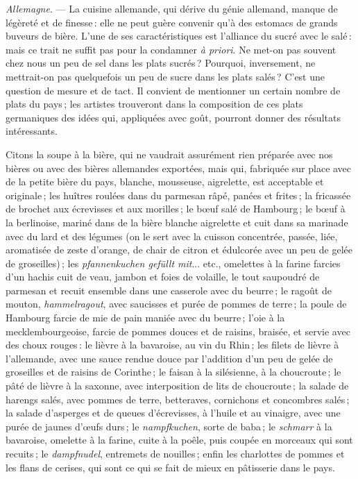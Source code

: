 \sk

\textit{Allemagne}. — La cuisine allemande, qui dérive du génie allemand,
manque de légèreté et de finesse : elle ne peut guère convenir qu'à des
estomacs de grands buveurs de bière. L'une de ses caractéristiques est
l'alliance du sucré avec le salé : mais ce trait ne suffit pas pour la
condamner \textit{à priori}. Ne met-on pas souvent chez nous un peu de sel dans
les plats sucrés ? Pourquoi, inversement, ne mettrait-on pas quelquefois un peu
de sucre dans les plats salés ? C'est une question de mesure et de tact. Il
convient de mentionner un certain nombre de plats du pays ; les artistes
trouveront dans la composition de ces plats germaniques des idées qui,
appliquées avec goût, pourront donner des résultats intéressants.

Citons la soupe à la bière, qui ne vaudrait assurément rien préparée avec nos
bières ou avec des bières allemandes exportées, mais qui, fabriquée sur place
avec de la petite bière du pays, blanche, mousseuse, aigrelette, est acceptable
et originale ; les huîtres roulées dans du parmesan râpé, panées et frites ; la
fricassée de brochet aux écrevisses et aux morilles ; le bœuf salé de
Hambourg ; le bœuf à la berlinoise, mariné dans de la bière blanche aigrelette
et cuit dans sa marinade avec du lard et des légumes (on le sert avec la
cuisson concentrée, passée, liée, aromatisée de zeste d'orange, de chair de
citron et édulcorée avec un peu de gelée de groseilles) ; les
\textit{pfannenkuchen gefüllt mit}... etc., omelettes à la farine farcies d'un
hachis cuit de veau, jambon et foies de volaille, le tout saupoudré de parmesan
et recuit ensemble dans une casserole avec du beurre ; le ragoût de mouton,
\textit{hammelragout}, avec saucisses et purée de pommes de terre ; la poule de
Hambourg farcie de mie de pain maniée avec du beurre ; l'oie à la
mecklembourgeoise, farcie de pommes douces et de raisins, braisée, et servie
avec des choux rouges : le lièvre à la bavaroise, au vin du Rhin ; les filets
de lièvre à l'allemande, avec une sauce rendue douce par l'addition d'un peu de
gelée de groseilles et de raisins de Corinthe ; le faisan à la silésienne, à la
choucroute ; le pâté de lièvre à la saxonne, avec interposition de lits de
choucroute ; la salade de harengs salés, avec pommes de terre, betteraves,
cornichons et concombres salés ; la salade d'asperges et de queues
d'écrevisses, à l'huile et au vinaigre, avec une purée de jaunes d'œufs durs ;
le \textit{nampfkuchen}, sorte de baba ; le \textit{schmarr} à la bavaroise,
omelette à la farine, cuite à la poêle, puis coupée en morceaux qui sont
recuits ; le \textit{dampfnudel}, entremets de nouilles ; enfin les charlottes
de pommes et les flans de cerises, qui sont ce qui se fait de mieux en
pâtisserie dans le pays.

